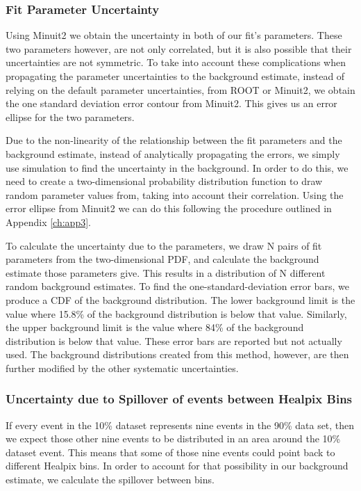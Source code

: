 \subsubsection{Fit Parameter Uncertainty}

Using Minuit2 we obtain the uncertainty in both of our fit's parameters.  These two parameters however, are not only correlated, but it is also possible that their uncertainties are not symmetric.  To take into account these complications when propagating the parameter uncertainties to the background estimate, instead of relying on the default parameter uncertainties, from ROOT or Minuit2, we obtain the one standard deviation error contour from Minuit2.  This gives us an error ellipse for the two parameters.

Due to the non-linearity of the relationship between the fit parameters and the background estimate, instead of analytically propagating the errors, we simply use simulation to find the uncertainty in the background.  In order to do this, we need to create a two-dimensional probability distribution function to draw random parameter values from, taking into account their correlation.  Using the error ellipse from Minuit2 we can do this following the procedure outlined in Appendix \ref{ch:app3}.

To calculate the uncertainty due to the parameters, we draw N pairs of fit parameters from the two-dimensional PDF, and calculate the background estimate those parameters give.  This results in a distribution of N different random background estimates.  To find the one-standard-deviation error bars, we produce a CDF of the background distribution.  The lower background limit is the value where 15.8\% of the background distribution is below that value.  Similarly, the upper background limit is the value where 84\% of the background distribution is below that value.  These error bars are reported but not actually used.  The background distributions created from this method, however, are then further modified by the other systematic uncertainties.

\subsubsection{Uncertainty due to Spillover of events between Healpix Bins} \label{subsubsec:spillover}

If every event in the 10\% dataset represents nine events in the 90\% data set, then we expect those other nine events to be distributed in an area around the 10\% dataset event.  This means that some of those nine events could point back to different Healpix bins.  In order to account for that possibility in our background estimate, we calculate the spillover between bins.

